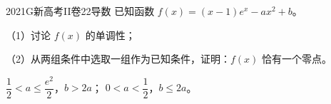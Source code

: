 
\begin{problem}{2021}{G}{新高考II卷}{22}{导数}
已知函数 $f(x)=(x-1)e^x-ax^2+b$。

（1）讨论 $f(x)$ 的单调性；

（2）从两组条件中选取一组作为已知条件，证明：$f(x)$ 恰有一个零点。

$\dfrac{1}{2}<a\leqslant\dfrac{e^2}{2}$，$b>2a$； $0<a<\dfrac{1}{2}$，$b\leqslant 2a$。
\end{problem}